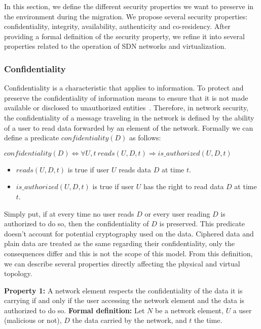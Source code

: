 \label{sec:security_prop}
In this section, we define the different security properties we want to preserve in the environment during the migration.
We propose several security properties: confidentiality, integrity, availability, authenticity and co-residency.
After providing a formal definition of the security property, we refine it into several properties related to the operation of SDN networks and virtualization.

\subsubsection{Confidentiality}
\label{sec:prop-conf}
Confidentiality is a characteristic that applies to information.
To protect and preserve the confidentiality of information means to ensure that it is not made available or disclosed to unauthorized entities~\cite{ISO/IEC270012013}.
Therefore, in network security, the confidentiality of a message traveling in the network is defined by the ability of a user to read data forwarded by an element of the network.
Formally we can define a predicate $confidentiality(D)$ as follows:

\begin{myformula}
$ confidentiality(D) \Leftrightarrow \forall U,t~reads(U,D,t) \Rightarrow is\_authorized(U,D,t)$
\end{myformula}

\begin{itemize}
\item $reads(U,D,t)$ is true if user $U$ reads data $D$ at time $t$.
\item $is\_authorized(U,D,t)$ is true if user $U$ has the right to read data $D$ at time $t$.
\end{itemize}
Simply put, if at every time no user reads $D$ or every user reading $D$ is authorized to do so, then the confidentiality of $D$ is preserved.
This predicate doesn't account for potential cryptography used on the data.
Ciphered data and plain data are treated as the same regarding their confidentiality, only the consequences differ and this is not the scope of this model.
From this definition, we can describe several properties directly affecting the physical and virtual topology.



\textbf{Property 1:} A network element respects the confidentiality of the data it is carrying if and only if the user accessing the network element and the data is authorized to do so.
\newline \textbf{Formal definition:} Let $N$ be a network element, $U$ a user (malicious or not), $D$ the data carried by the network, and $t$ the time.



